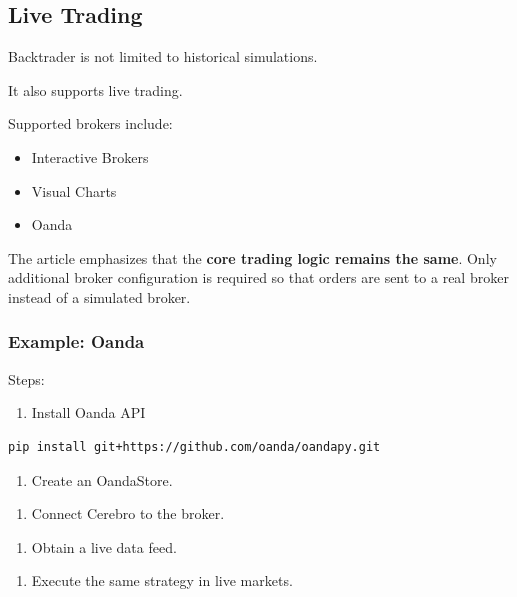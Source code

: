 \documentclass[12pt,openany]{book}
\begin{document}
\subsection{Live Trading}

Backtrader is not limited to historical simulations.

It also supports live trading.

Supported brokers include:

\begin{itemize}[leftmargin=*]
    \item Interactive Brokers
    \item Visual Charts
    \item Oanda
\end{itemize}

The article emphasizes that the \textbf{core trading logic remains the same}. Only additional broker configuration is required so that orders are sent to a real broker instead of a simulated broker.

\subsubsection{Example: Oanda}

Steps:

\begin{enumerate}[leftmargin=*]
    \item Install Oanda API
\end{enumerate}

\begin{Verbatim}[breaklines=true,breakanywhere=true,fontsize=\small]
pip install git+https://github.com/oanda/oandapy.git
\end{Verbatim}

\begin{enumerate}[leftmargin=*]
    \item Create an OandaStore.
\end{enumerate}

\begin{enumerate}[leftmargin=*]
    \item Connect Cerebro to the broker.
\end{enumerate}

\begin{enumerate}[leftmargin=*]
    \item Obtain a live data feed.
\end{enumerate}

\begin{enumerate}[leftmargin=*]
    \item Execute the same strategy in live markets.
\end{enumerate}
\end{document}
